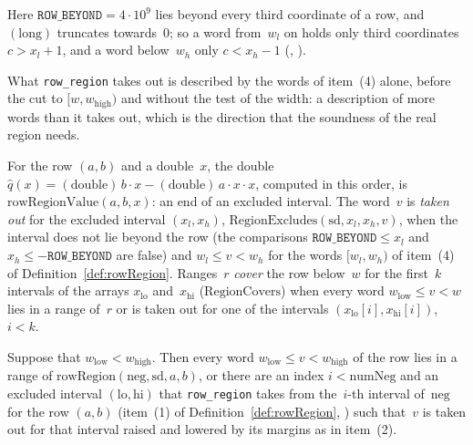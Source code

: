 Here $\mathtt{ROW\_BEYOND} = 4 \cdot 10^9$ lies beyond every third coordinate of a row, and
$(\mathrm{long})$ truncates towards~$0$; so a word from~$w_l$ on holds only third coordinates
$c > x_l + 1$, and a word below~$w_h$ only $c < x_h - 1$ (,
).


What \texttt{row\_region} takes out is described by the words of item~(4) alone, before the cut to
$[w, w_{\mathrm{high}})$ and without the test of the width: a description of more words than it
takes out, which is the direction that the soundness of the real region needs.

\begin{definition}\label{def:RegionExcludes}
  \leanok
  For the row $(a, b)$ and a double~$x$, the double $\widehat{q}(x) = (\mathrm{double})\,b \cdot x -
  (\mathrm{double})\,a \cdot x \cdot x$, computed in this order, is
  $\mathrm{rowRegionValue}(a, b, x)$: an end of an excluded interval. The word~$v$ is \emph{taken out} for the excluded interval
  $(x_l, x_h)$, $\mathrm{RegionExcludes}(\mathrm{sd}, x_l, x_h, v)$, when the interval does not lie
  beyond the row (the comparisons $\mathtt{ROW\_BEYOND} \le x_l$ and
  $x_h \le -\mathtt{ROW\_BEYOND}$ are false) and $w_l \le v < w_h$ for the words $[w_l, w_h)$ of
  item~(4) of Definition~\ref{def:rowRegion}. Ranges~$r$ \emph{cover} the row below~$w$ for the
  first~$k$ intervals of the arrays $x_{\mathrm{lo}}$ and~$x_{\mathrm{hi}}$ ($\mathrm{RegionCovers}$)
  when every word
  $w_{\mathrm{low}} \le v < w$ lies in a range of~$r$ or is taken out for one of the intervals
  $(x_{\mathrm{lo}}[i], x_{\mathrm{hi}}[i])$, $i < k$.
\end{definition}

\begin{lemma}\label{lem:rowRegion_cover}
  \leanok
  Suppose that $w_{\mathrm{low}} < w_{\mathrm{high}}$. Then every word $w_{\mathrm{low}} \le v <
  w_{\mathrm{high}}$ of the row lies in a range of $\mathrm{rowRegion}(\mathrm{neg}, \mathrm{sd}, a,
  b)$, or there are an index $i < \mathrm{numNeg}$ and an excluded interval $(\mathrm{lo},
  \mathrm{hi})$ that \texttt{row\_region} takes from the~$i$-th interval of~$\mathrm{neg}$ for the
  row $(a, b)$ (item~(1) of Definition~\ref{def:rowRegion}, ) such
  that~$v$ is taken out for that interval raised and lowered by its margins as in item~(2).
\end{lemma}

